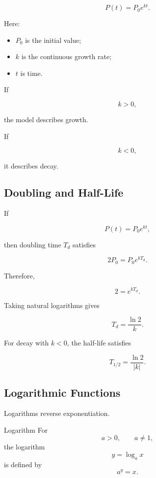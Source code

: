 \[ P(t)=P_0e^{kt}. \]

Here:

\begin{itemize}
    \item \(P_0\) is the initial value;
    \item \(k\) is the continuous growth rate;
    \item \(t\) is time.
\end{itemize}

If

\[ k>0, \]

the model describes growth.

If

\[ k<0, \]

it describes decay.

\subsection{Doubling and Half-Life}
\label{subsec:doubling-half-life}

If

\[ P(t)=P_0e^{kt}, \]

then doubling time \(T_d\) satisfies

\[ 2P_0=P_0e^{kT_d}. \]

Therefore,

\[ 2=e^{kT_d}. \]

Taking natural logarithms gives

\[ T_d=\frac{\ln2}{k}. \]

For decay with \(k<0\), the half-life satisfies

\[ T_{1/2}=\frac{\ln2}{|k|}. \]

\subsection{Logarithmic Functions}
\label{subsec:logarithmic-functions-analysis}

Logarithms reverse exponentiation.

\begin{definitionbox}{Logarithm}
For
\[ a>0,\qquad a\neq1, \]
the logarithm
\[ y=\log_a x \]
is defined by
\[ a^y=x. \]
\end{definitionbox}

